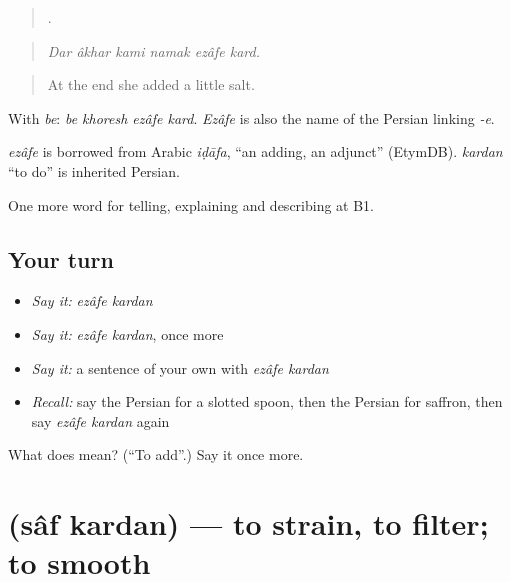 \begin{quote}
     .
\end{quote}

\begin{quote}
\emph{Dar âkhar kami namak ezâfe kard.}
\end{quote}

\begin{quote}
At the end she added a little salt.
\end{quote}

With \emph{be}: \emph{be khoresh ezâfe kard}. \emph{Ezâfe} is also the name of the Persian linking \emph{-e}.

\begin{cousinweb}
\emph{ezâfe} is borrowed from Arabic \emph{iḍāfa}, \textquotedblleft{}an adding, an adjunct\textquotedblright{} (EtymDB). \emph{kardan} \textquotedblleft{}to do\textquotedblright{} is inherited Persian.
\end{cousinweb}

\begin{grammarlens}[title={What you've built}]
One more word for telling, explaining and describing at B1.
\end{grammarlens}

\subsection*{Your turn}
\begin{itemize}
\raggedright
  \item \emph{Say it:} \emph{ezâfe kardan}
  \item \emph{Say it:} \emph{ezâfe kardan}, once more
  \item \emph{Say it:} a sentence of your own with \emph{ezâfe kardan}
  \item \emph{Recall:} say the Persian for a slotted spoon, then the Persian for saffron, then say \emph{ezâfe kardan} again
\end{itemize}

\begin{tcolorbox}[breakable,colback=teal!4,colframe=teal!35!black,title={Before you move on}]
What does   mean? (\textquotedblleft{}To add\textquotedblright{}.) Say it once more.
\end{tcolorbox}
\section[\texorpdfstring{\fa{صاف} \fa{کردن} (sâf kardan)}{صاف کردن (sâf kardan)}]{  (sâf kardan) — to strain, to filter; to smooth}

